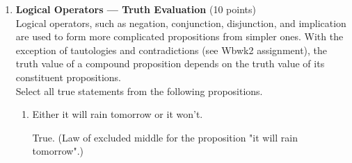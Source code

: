 \begin{enumerate}
\begin{enumerate}[label=\Alph*.]
    \item 1729 is the smallest number which is expressible as the sum of two cubes in two different ways.\\
    \begin{subanswer}
      Proposition; True. (Ramanujan's property of 1729.)
    \end{subanswer}

    \item Divide 1729 by 91.\\
    \begin{subanswer}
      Not a proposition. (Imperative/command, not declarative.)
    \end{subanswer}

    \item The universe is expanding.\\
    \begin{subanswer}
      Proposition; True (empirical claim accepted by current evidence).
    \end{subanswer}

    \item The Poincare conjecture is true.\\
    \begin{subanswer}
      Proposition; True (now proven).
    \end{subanswer}

    \item Pigs can fly.\\
    \begin{subanswer}
      Proposition; False (false under ordinary biological assumptions).
    \end{subanswer}
  \end{enumerate}



  \newpage


  \item \textbf{Logical Operators --- Truth Evaluation} (10 points)\\
  Logical operators, such as negation, conjunction, disjunction, and 
  implication are used to form more complicated propositions from simpler 
  ones. With the exception of tautologies and contradictions 
  (see Wbwk2 assignment), the truth value of a compound proposition 
  depends on the truth value of its constituent propositions.\\

  Select all true statements from the following propositions.
  \begin{enumerate}[label=\Alph*.]
    \item Either it will rain tomorrow or it won't.\\
    \begin{subanswer}
      True. (Law of excluded middle for the proposition "it will rain tomorrow".)
    \end{subanswer}


\end{enumerate}
\end{enumerate}
